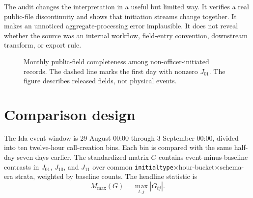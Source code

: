 \documentclass[11pt]{article}
\begin{document}
The audit changes the interpretation in a useful but limited way. It verifies a real public-file discontinuity and shows that initiation streams change together. It makes an unnoticed aggregate-processing error implausible. It does not reveal whether the source was an internal workflow, field-entry convention, downstream transform, or export rule.

\begin{figure}[t]
\centering
{}
\caption{Monthly public-field completeness among non-officer-initiated records. The dashed line marks the first day with nonzero $J_{01}$. The figure describes released fields, not physical events.}
\label{fig:monthly}
\end{figure}

\section{Comparison design}

The Ida event window is 29 August 00:00 through 3 September 00:00, divided into ten twelve-hour call-creation bins. Each bin is compared with the same half-day seven days earlier. The standardized matrix $G$ contains event-minus-baseline contrasts in $J_{01}$, $J_{10}$, and $J_{11}$ over common \texttt{initialtype}$\times$hour-bucket$\times$schema-era strata, weighted by baseline counts. The headline statistic is
\begin{equation}
M_{\max}(G)=\max_{t,j}|G_{tj}|.
\end{equation}
\end{document}
